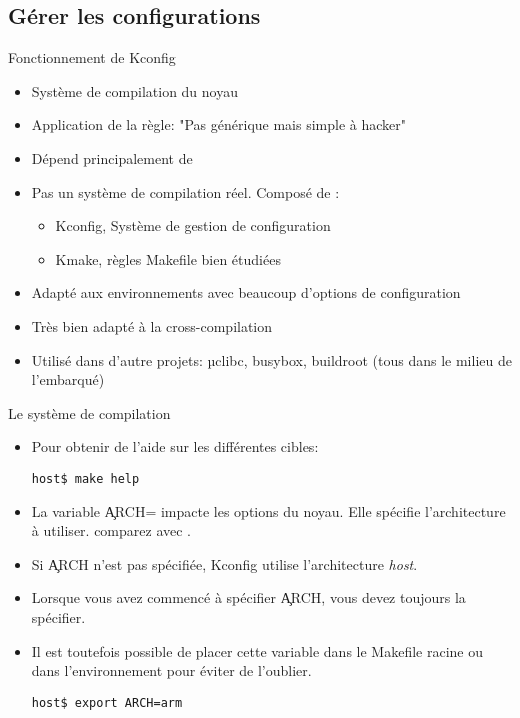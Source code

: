\subsection{Gérer les configurations}
\begin{frame}[fragile=singleslide]{Fonctionnement de Kconfig}
  \begin{itemize}
  \item Système de compilation du noyau
  \item Application de la règle: "Pas générique mais simple à hacker"
  \item Dépend principalement de 
  \item  Pas un  système de  compilation réel. Composé de :
    \begin{itemize}
    \item Kconfig, Système de gestion de configuration
    \item Kmake, règles Makefile bien étudiées
    \end{itemize}
  \item   Adapté  aux  environnements   avec  beaucoup   d'options  de
    configuration
  \item Très bien adapté à la cross-compilation
  \item Utilisé dans d'autre projets: µclibc, busybox, buildroot (tous
    dans le milieu de l'embarqué)
\end{itemize}
\end{frame} 

\begin{frame}[fragile=singleslide]{Le système de compilation}
\begin{itemize} 
  \item Pour obtenir de l'aide sur les différentes cibles:
    \begin{lstlisting}
host$ make help
    \end{lstlisting} 
  \item  La variable  \c{ARCH=}  impacte les  options  du noyau.  Elle
    spécifie l'architecture à utiliser.  comparez  avec
    . 
  \item   Si   \c{ARCH}   n'est   pas   spécifiée,   Kconfig   utilise
    l'architecture \emph{host}.
  \item Lorsque  vous avez commencé  à spécifier \c{ARCH},  vous devez
    toujours la  spécifier. 
  \item Il  est toutefois  possible de placer  cette variable  dans le
    Makefile racine ou dans l'environnement pour éviter de l'oublier.
    \begin{lstlisting}
host$ export ARCH=arm 
    \end{lstlisting} 
  \end{itemize} 
\end{frame} 

